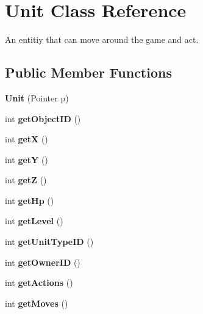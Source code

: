 \hypertarget{classUnit}{
\section{Unit Class Reference}
\label{classUnit}
}
An entitiy that can move around the game and act.  


\subsection*{Public Member Functions}
\begin{CompactItemize}
\item 
\hypertarget{classUnit_2855ec698ccacac7d041b815492c7058}{
\textbf{Unit} (Pointer p)}
\label{classUnit_2855ec698ccacac7d041b815492c7058}

\item 
\hypertarget{classUnit_cc7a9e4ff132046e17cf29ab90f9303a}{
int \textbf{getObjectID} ()}
\label{classUnit_cc7a9e4ff132046e17cf29ab90f9303a}

\item 
\hypertarget{classUnit_1e612a48ea929b7628195e26a86ce037}{
int \textbf{getX} ()}
\label{classUnit_1e612a48ea929b7628195e26a86ce037}

\item 
\hypertarget{classUnit_b103f4e688f764e5f1a45ab37b30f6cc}{
int \textbf{getY} ()}
\label{classUnit_b103f4e688f764e5f1a45ab37b30f6cc}

\item 
\hypertarget{classUnit_d33d8669c787599577585469657921fb}{
int \textbf{getZ} ()}
\label{classUnit_d33d8669c787599577585469657921fb}

\item 
\hypertarget{classUnit_e7694825d780cb253de481800d4470cd}{
int \textbf{getHp} ()}
\label{classUnit_e7694825d780cb253de481800d4470cd}

\item 
\hypertarget{classUnit_b9cb2a6aefb38bd4a27be772a25d43b6}{
int \textbf{getLevel} ()}
\label{classUnit_b9cb2a6aefb38bd4a27be772a25d43b6}

\item 
\hypertarget{classUnit_0c086dffff3ae1cbb81d153075424729}{
int \textbf{getUnitTypeID} ()}
\label{classUnit_0c086dffff3ae1cbb81d153075424729}

\item 
\hypertarget{classUnit_2cb90efc5c871a982cc0fd291208f3ca}{
int \textbf{getOwnerID} ()}
\label{classUnit_2cb90efc5c871a982cc0fd291208f3ca}

\item 
\hypertarget{classUnit_d8fc2bf23b5ee46010635606117b5585}{
int \textbf{getActions} ()}
\label{classUnit_d8fc2bf23b5ee46010635606117b5585}

\item 
\hypertarget{classUnit_65c306a5066849f9cf804366da558100}{
int \textbf{getMoves} ()}
\label{classUnit_65c306a5066849f9cf804366da558100}

\end{CompactItemize}
